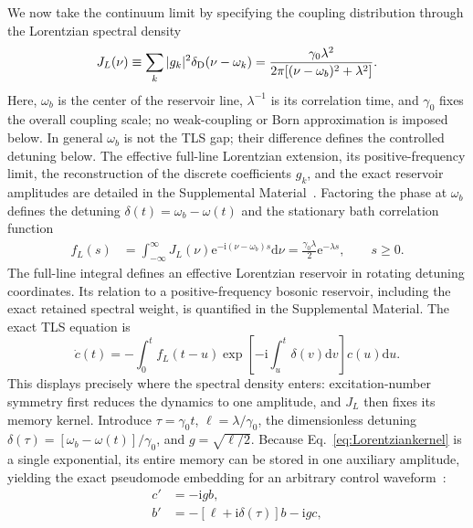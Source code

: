 \documentclass[reprint,superscriptaddress,floatfix,amsmath,amssymb,prresearch,aps]{revtex4-2}
\newcommand{\dd}{\mathrm{d}}
\newcommand{\ee}{\mathrm{e}}
\newcommand{\ii}{\mathrm{i}}
\begin{document}
We now take the continuum limit by specifying the coupling distribution
through the Lorentzian spectral density
\begin{equation}
J_L(\nu) \equiv \sum_k|g_k|^2\delta_{\rm D}(\nu-\omega_k)
=\frac{\gamma_0\lambda^2}
{2\pi[(\nu-\omega_b)^2+\lambda^2]}.
\label{eq:Lorentziandensity}
\end{equation}
Here, \(\omega_b\) is the center of the reservoir line, \(\lambda^{-1}\) is
its correlation time, and \(\gamma_0\) fixes the overall coupling scale; no
weak-coupling or Born approximation is imposed below. In general
\(\omega_b\) is not the TLS gap; their difference defines the controlled
detuning below. The effective full-line Lorentzian extension, its
positive-frequency limit, the reconstruction of the discrete coefficients
\(g_k\), and the exact
reservoir amplitudes are detailed in the Supplemental
Material~\cite{SupplementalMaterial}. Factoring the phase at \(\omega_b\)
defines the detuning \(\delta(t)=\omega_b-\omega(t)\) and the stationary bath
correlation function
\begin{align}
f_L(s)&=\int_{-\infty}^{\infty}J_L(\nu)
\ee^{-\ii(\nu-\omega_b)s}\dd\nu =\frac{\gamma_0\lambda}{2}\ee^{-\lambda s},
\qquad s\geq0.
\label{eq:Lorentziankernel}
\end{align}
The full-line integral defines an effective Lorentzian reservoir in rotating
detuning coordinates. Its relation to a positive-frequency bosonic reservoir,
including the exact retained spectral weight, is quantified in the
Supplemental Material. The exact TLS equation is
\begin{equation}
\dot c(t)=-\int_0^t f_L(t-u)
\exp\!\left[-\ii\int_u^t\delta(v)\dd v\right]c(u)\dd u.
\label{eq:atomicVolterra}
\end{equation}
This displays precisely where the spectral density enters: excitation-number
symmetry first reduces the dynamics to one amplitude, and \(J_L\) then fixes
its memory kernel. Introduce \(\tau=\gamma_0t\),
\(\ell=\lambda/\gamma_0\), the dimensionless detuning
\(\delta(\tau)=[\omega_b-\omega(t)]/\gamma_0\), and
\(g=\sqrt{\ell/2}\). Because Eq.~\eqref{eq:Lorentziankernel} is a single
exponential, its entire memory can be stored in one auxiliary amplitude,
yielding the exact pseudomode embedding for an arbitrary control
waveform~\cite{Garraway1997,Pleasance2020}:
\begin{align}
c'&=-\ii g b,\nonumber\\
b'&=-[\ell+\ii\delta(\tau)]b-\ii g c,
\label{eq:pseudomode}
\end{align}
\end{document}
